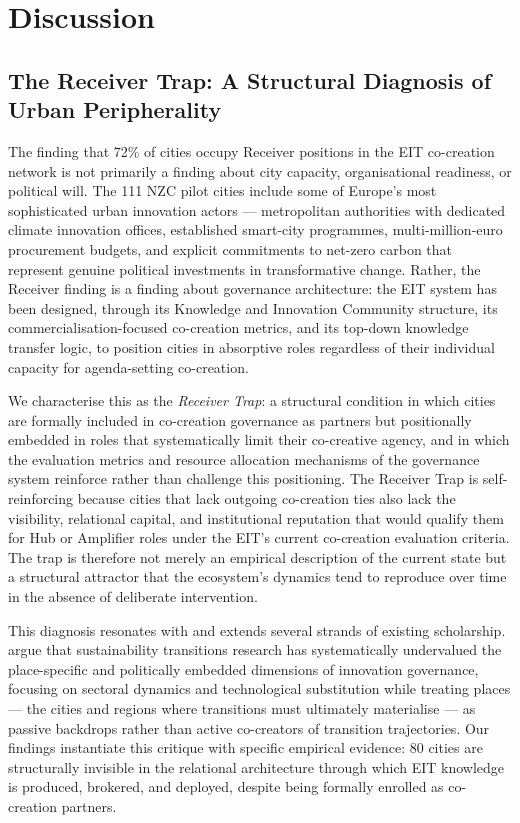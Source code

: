\documentclass[review,12pt]{elsarticle}
\begin{document}
\section{Discussion}
\label{sec:discussion}

\subsection{The Receiver Trap: A Structural Diagnosis of Urban Peripherality}

The finding that 72\% of cities occupy Receiver positions in the EIT co-creation network is not primarily a finding about city capacity, organisational readiness, or political will. The 111 NZC pilot cities include some of Europe's most sophisticated urban innovation actors --- metropolitan authorities with dedicated climate innovation offices, established smart-city programmes, multi-million-euro procurement budgets, and explicit commitments to net-zero carbon that represent genuine political investments in transformative change. Rather, the Receiver finding is a finding about governance architecture: the EIT system has been designed, through its Knowledge and Innovation Community structure, its commercialisation-focused co-creation metrics, and its top-down knowledge transfer logic, to position cities in absorptive roles regardless of their individual capacity for agenda-setting co-creation.

We characterise this as the \emph{Receiver Trap}: a structural condition in which cities are formally included in co-creation governance as partners but positionally embedded in roles that systematically limit their co-creative agency, and in which the evaluation metrics and resource allocation mechanisms of the governance system reinforce rather than challenge this positioning. The Receiver Trap is self-reinforcing because cities that lack outgoing co-creation ties also lack the visibility, relational capital, and institutional reputation that would qualify them for Hub or Amplifier roles under the EIT's current co-creation evaluation criteria. The trap is therefore not merely an empirical description of the current state but a structural attractor that the ecosystem's dynamics tend to reproduce over time in the absence of deliberate intervention.

This diagnosis resonates with and extends several strands of existing scholarship. \citet{coenen2012place} argue that sustainability transitions research has systematically undervalued the place-specific and politically embedded dimensions of innovation governance, focusing on sectoral dynamics and technological substitution while treating places --- the cities and regions where transitions must ultimately materialise --- as passive backdrops rather than active co-creators of transition trajectories. Our findings instantiate this critique with specific empirical evidence: 80 cities are structurally invisible in the relational architecture through which EIT knowledge is produced, brokered, and deployed, despite being formally enrolled as co-creation partners.
\end{document}
